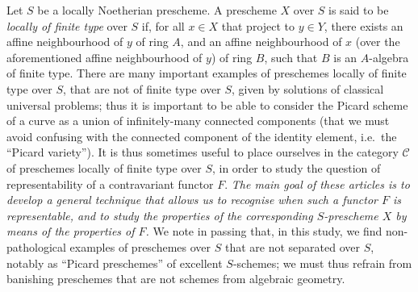 \documentclass{article}
\newcommand{\oldpage}[1]{\marginpar{\footnotesize$\Big\vert$ \textit{p.~#1}}}
\theoremstyle{definition}
\theoremstyle{definition}
\theoremstyle{definition}
\theoremstyle{definition}
\theoremstyle{remark}
\begin{document}
Let \(S\) be a locally Noetherian prescheme.
\oldpage{195-11}A prescheme \(X\) over \(S\) is said to be \emph{locally of finite type} over \(S\) if, for all \(x\in X\) that project to \(y\in Y\), there exists an affine neighbourhood of \(y\) of ring \(A\), and an affine neighbourhood of \(x\) (over the aforementioned affine neighbourhood of \(y\)) of ring \(B\), such that \(B\) is an \(A\)-algebra of finite type.
There are many important examples of preschemes locally of finite type over \(S\), that are not of finite type over \(S\), given by solutions of classical universal problems;
thus it is important to be able to consider the Picard scheme of a curve as a union of infinitely-many connected components (that we must avoid confusing with the connected component of the identity element, i.e.~the ``Picard variety'').
It is thus sometimes useful to place ourselves in the category \({\mathcal{C}}\) of preschemes locally of finite type over \(S\), in order to study the question of representability of a contravariant functor \(F\).
\emph{The main goal of these articles is to develop a general technique that allows us to recognise when such a functor \(F\) is representable, and to study the properties of the corresponding \(S\)-prescheme \(X\) by means of the properties of \(F\).}
We note in passing that, in this study, we find non-pathological examples of preschemes over \(S\) that are not separated over \(S\), notably as ``Picard preschemes'' of excellent \(S\)-schemes;
we must thus refrain from banishing preschemes that are not schemes from algebraic geometry.
\end{document}
